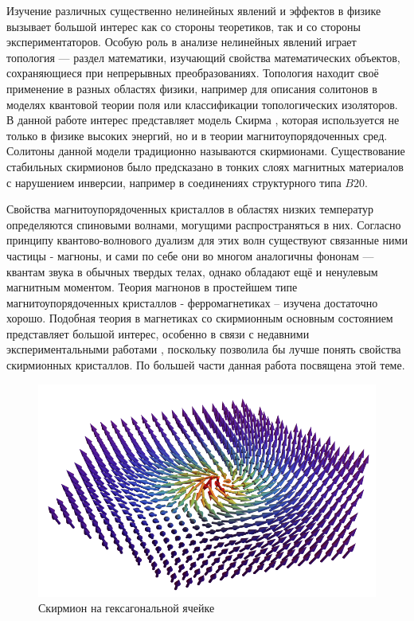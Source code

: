 \documentclass[a4paper,article,14pt]{extarticle}
\begin{document}


\tableofcontents
\pagebreak


Изучение различных существенно нелинейных явлений и эффектов в физике вызывает большой интерес как со стороны теоретиков, так и со стороны экспериментаторов.  Особую роль в анализе нелинейных явлений играет топология --- раздел математики, изучающий свойства  математических объектов, сохраняющиеся при непрерывных преобразованиях. Топология находит своё применение в разных областях физики, например для описания солитонов в моделях квантовой теории поля \cite{rajaraman} или классификации топологических изоляторов. \cite{kitaev} В данной работе интерес представляет модель Скирма \cite{skyrme}, которая используется не только в физике высоких энергий, но и в теории магнитоупорядоченных сред. Солитоны данной модели традиционно называются скирмионами. Существование стабильных скирмионов было предсказано в тонких слоях магнитных материалов с нарушением инверсии, например в соединениях структурного типа $B20$.\cite{roslerBogdanov}


Свойства магнитоупорядоченных кристаллов в областях низких температур определяются спиновыми волнами, \cite{ahiezer} могущими распространяться в них. Согласно принципу квантово-волнового дуализм для этих волн существуют связанные ними частицы - магноны, и сами по себе они во многом аналогичны фононам --- квантам звука в обычных твердых телах, однако обладают ещё и ненулевым магнитным моментом. Теория магнонов в простейшем типе магнитоупорядоченных кристаллов - ферромагнетиках – изучена достаточно хорошо. Подобная теория в магнетиках со скирмионным основным состоянием представляет большой интерес, особенно в связи с недавними экспериментальными работами \cite{mulhbauer, yu}, поскольку позволила бы лучше понять свойства скирмионных кристаллов. По большей части данная работа посвящена этой теме.


\begin{figure}[h]
	\centering
	\includegraphics[width=0.5\paperwidth]{images/skyrmionPic.png}
	\caption{Скирмион на гексагональной ячейке}
	\label{pic:skyrmion}
\end{figure}
\end{document}
